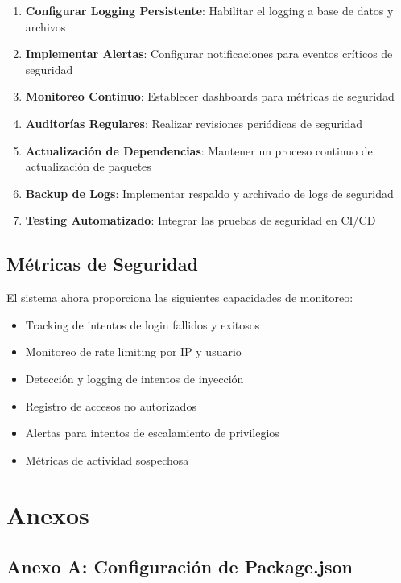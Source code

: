 \documentclass[12pt,a4paper]{article}
\begin{document}
\begin{enumerate}
    \item \textbf{Configurar Logging Persistente}: Habilitar el logging a base de datos y archivos
    \item \textbf{Implementar Alertas}: Configurar notificaciones para eventos críticos de seguridad
    \item \textbf{Monitoreo Continuo}: Establecer dashboards para métricas de seguridad
    \item \textbf{Auditorías Regulares}: Realizar revisiones periódicas de seguridad
    \item \textbf{Actualización de Dependencias}: Mantener un proceso continuo de actualización de paquetes
    \item \textbf{Backup de Logs}: Implementar respaldo y archivado de logs de seguridad
    \item \textbf{Testing Automatizado}: Integrar las pruebas de seguridad en CI/CD
\end{enumerate}

\subsection{Métricas de Seguridad}

El sistema ahora proporciona las siguientes capacidades de monitoreo:

\begin{itemize}
    \item Tracking de intentos de login fallidos y exitosos
    \item Monitoreo de rate limiting por IP y usuario
    \item Detección y logging de intentos de inyección
    \item Registro de accesos no autorizados
    \item Alertas para intentos de escalamiento de privilegios
    \item Métricas de actividad sospechosa
\end{itemize}

\section{Anexos}

\subsection{Anexo A: Configuración de Package.json}
\end{document}
